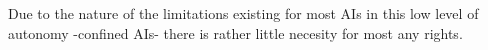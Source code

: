 Due to the nature of the limitations existing for most AIs in this low level of autonomy -confined AIs- there is rather little necesity for most any rights.